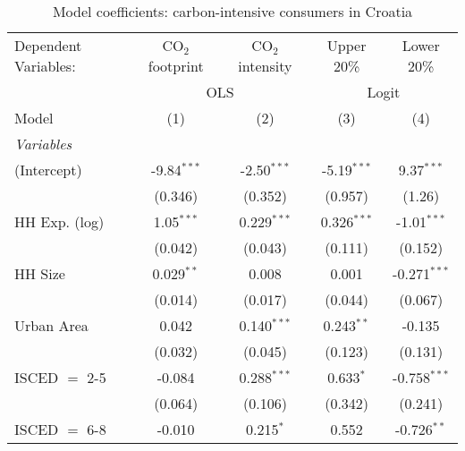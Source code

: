 
\begin{table}[htbp!]
   \centering
   \small
   \begin{adjustbox}{width = 1\textwidth, max height = 0.95\textheight, center}
      \begin{threeparttable}[b]
         \caption{\label{tab:Logit_1_HRV} Model coefficients: carbon-intensive consumers in Croatia}
         \begin{tabular}{lcccc}
            \tabularnewline \midrule \midrule
            Dependent Variables: & CO$_{2}$ footprint & CO$_{2}$ intensity & Upper 20\%    & Lower 20\%\\   
             & \multicolumn{2}{c}{OLS} & \multicolumn{2}{c}{Logit} \\ 
            Model                & (1)                & (2)                & (3)           & (4)\\  
            \midrule
            \emph{Variables}\\
            (Intercept)          & -9.84$^{***}$      & -2.50$^{***}$      & -5.19$^{***}$ & 9.37$^{***}$\\   
                                 & (0.346)            & (0.352)            & (0.957)       & (1.26)\\   
            HH Exp. (log)        & 1.05$^{***}$       & 0.229$^{***}$      & 0.326$^{***}$ & -1.01$^{***}$\\   
                                 & (0.042)            & (0.043)            & (0.111)       & (0.152)\\   
            HH Size              & 0.029$^{**}$       & 0.008              & 0.001         & -0.271$^{***}$\\   
                                 & (0.014)            & (0.017)            & (0.044)       & (0.067)\\   
            Urban Area           & 0.042              & 0.140$^{***}$      & 0.243$^{**}$  & -0.135\\   
                                 & (0.032)            & (0.045)            & (0.123)       & (0.131)\\   
            ISCED $=$ 2-5        & -0.084             & 0.288$^{***}$      & 0.633$^{*}$   & -0.758$^{***}$\\   
                                 & (0.064)            & (0.106)            & (0.342)       & (0.241)\\   
            ISCED $=$ 6-8        & -0.010             & 0.215$^{*}$        & 0.552         & -0.726$^{**}$\\   

\end{tabular}
\end{threeparttable}
\end{adjustbox}
\end{table}
